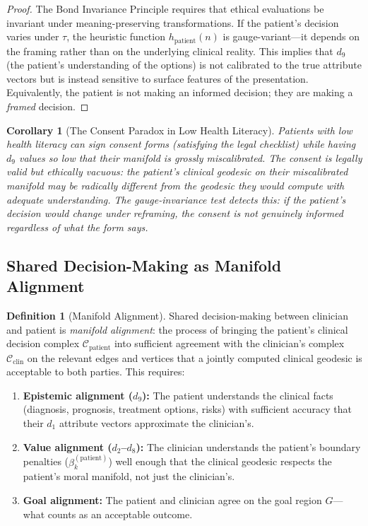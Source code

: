 \documentclass[12pt]{article}
\newtheorem{corollary}[theorem]{Corollary}
\theoremstyle{definition}
\newtheorem{definition}[theorem]{Definition}
\theoremstyle{remark}
\newcommand{\C}{\mathcal{C}}               %
\begin{document}
\begin{proof}
The Bond Invariance Principle \cite{bond2026geometric} requires that ethical evaluations be invariant under meaning-preserving transformations.  If the patient's decision varies under $\tau$, the heuristic function $h_{\text{patient}}(n)$ is gauge-variant---it depends on the framing rather than on the underlying clinical reality.  This implies that $d_9$ (the patient's understanding of the options) is not calibrated to the true attribute vectors but is instead sensitive to surface features of the presentation.  Equivalently, the patient is not making an informed decision; they are making a \emph{framed} decision.
\end{proof}

\begin{corollary}[The Consent Paradox in Low Health Literacy]
\label{cor:consent_paradox}
Patients with low health literacy can sign consent forms (satisfying the legal checklist) while having $d_9$ values so low that their manifold is grossly miscalibrated.  The consent is legally valid but ethically vacuous: the patient's clinical geodesic on their miscalibrated manifold may be radically different from the geodesic they would compute with adequate understanding.  The gauge-invariance test detects this: if the patient's decision would change under reframing, the consent is not genuinely informed regardless of what the form says.
\end{corollary}

\subsection{Shared Decision-Making as Manifold Alignment}

\begin{definition}[Manifold Alignment]
\label{def:manifold_alignment}
Shared decision-making between clinician and patient is \emph{manifold alignment}: the process of bringing the patient's clinical decision complex $\C_{\text{patient}}$ into sufficient agreement with the clinician's complex $\C_{\text{clin}}$ on the relevant edges and vertices that a jointly computed clinical geodesic is acceptable to both parties.  This requires:
\begin{enumerate}
    \item \textbf{Epistemic alignment ($d_9$):} The patient understands the clinical facts (diagnosis, prognosis, treatment options, risks) with sufficient accuracy that their $d_1$ attribute vectors approximate the clinician's.
    \item \textbf{Value alignment ($d_2$--$d_8$):} The clinician understands the patient's boundary penalties ($\beta_k^{(\text{patient})}$) well enough that the clinical geodesic respects the patient's moral manifold, not just the clinician's.
    \item \textbf{Goal alignment:} The patient and clinician agree on the goal region $G$---what counts as an acceptable outcome.
\end{enumerate}
\end{definition}
\end{document}
